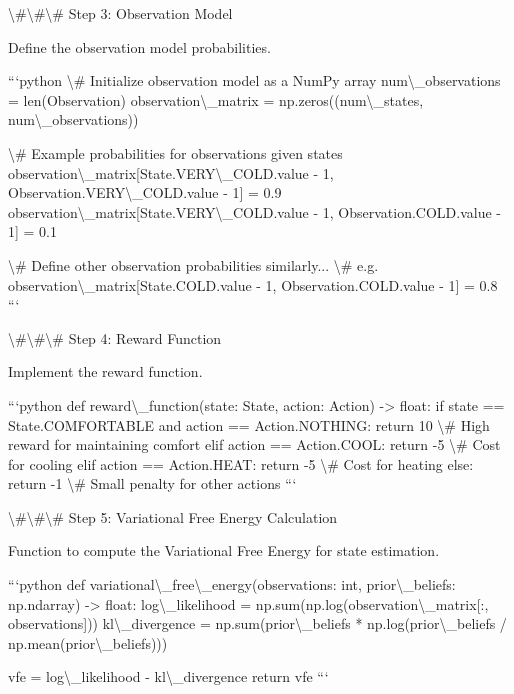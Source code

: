 \documentclass[11pt,a4paper]{article}
\begin{document}
\textbackslash{}#\textbackslash{}#\textbackslash{}# Step 3: Observation Model

Define the observation model probabilities.

```python
\textbackslash{}# Initialize observation model as a NumPy array
num\textbackslash{}_observations = len(Observation)
observation\textbackslash{}_matrix = np.zeros((num\textbackslash{}_states, num\textbackslash{}_observations))

\textbackslash{}# Example probabilities for observations given states
observation\textbackslash{}_matrix[State.VERY\textbackslash{}_COLD.value - 1, Observation.VERY\textbackslash{}_COLD.value - 1] = 0.9
observation\textbackslash{}_matrix[State.VERY\textbackslash{}_COLD.value - 1, Observation.COLD.value - 1] = 0.1

\textbackslash{}# Define other observation probabilities similarly...
\textbackslash{}# e.g. observation\textbackslash{}_matrix[State.COLD.value - 1, Observation.COLD.value - 1] = 0.8
```

\textbackslash{}#\textbackslash{}#\textbackslash{}# Step 4: Reward Function

Implement the reward function.

```python
def reward\textbackslash{}_function(state: State, action: Action) -\textgreater{} float:
    if state == State.COMFORTABLE and action == Action.NOTHING:
        return 10  \textbackslash{}# High reward for maintaining comfort
    elif action == Action.COOL:
        return -5  \textbackslash{}# Cost for cooling
    elif action == Action.HEAT:
        return -5  \textbackslash{}# Cost for heating
    else:
        return -1  \textbackslash{}# Small penalty for other actions
```

\textbackslash{}#\textbackslash{}#\textbackslash{}# Step 5: Variational Free Energy Calculation

Function to compute the Variational Free Energy for state estimation.

```python
def variational\textbackslash{}_free\textbackslash{}_energy(observations: int, prior\textbackslash{}_beliefs: np.ndarray) -\textgreater{} float:
    log\textbackslash{}_likelihood = np.sum(np.log(observation\textbackslash{}_matrix[:, observations]))
    kl\textbackslash{}_divergence = np.sum(prior\textbackslash{}_beliefs * np.log(prior\textbackslash{}_beliefs / np.mean(prior\textbackslash{}_beliefs)))

    vfe = log\textbackslash{}_likelihood - kl\textbackslash{}_divergence
    return vfe
```
\end{document}
